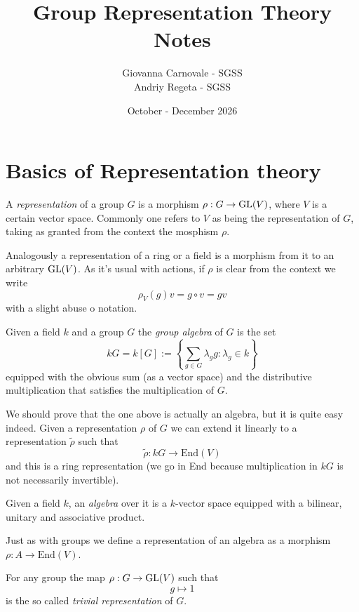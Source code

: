 \documentclass[11pt]{scrartcl}
\begin{document}
	\title{
		Group Representation Theory Notes
		 }
	\subtitle{
		Giovanna Carnovale - SGSS \\
		Andriy Regeta - SGSS 
	}
	\date{October - December 2026}
	
	
	\maketitle
	
	\tableofcontents
	
	\newpage
	
	\section{Basics of Representation theory}
	
	\begin{definition}
		A \textit{representation} of a group $G$ is a morphism $\rho:G\to \operatorname{GL}(V)$, where $V$ is a certain vector space. Commonly one refers to $V$ as being the representation of $G$, taking as granted from the context the mosphism $\rho$. 
	\end{definition}
	Analogously a representation of a ring or a field is a morphism from it to an arbitrary $\operatorname{GL}(V)$. As it's usual with actions, if $\rho$ is clear from the context we write
	$$\rho_V(g)v=g\circ v=gv$$
	with a slight abuse o notation.
	\begin{definition}
		Given a field $k$ and a group $G$ the \textit{group algebra} of $G$ is the set
		$$kG=k\left[G\right]:=\left\{\sum_{g\in G}\lambda_g g:\lambda_g\in k\right\}$$
		equipped with the obvious sum (as a vector space) and the distributive multiplication that satisfies the multiplication of $G$.
	\end{definition}
	We should prove that the one above is actually an algebra, but it is quite easy indeed. Given a representation $\rho$ of $G$ we can extend it linearly to a representation $\tilde{\rho}$ such that
	$$\tilde{\rho}:kG \to \text{End}(V)$$
	and this is a ring representation (we go in End because multiplication in $kG$ is not necessarily invertible).
	\begin{definition}[Algebra]
		Given a field $k$, an \textit{algebra} over it is a $k$-vector space equipped with a bilinear, unitary and associative product.
	\end{definition}
	Just as with groups we define a representation of an algebra as a morphism $\rho:A \to \text{End}(V)$.
	\begin{example}
		For any group the map
		$\rho:G\to \operatorname{GL}(V)$
		such that
		$$g\mapsto 1$$
		is the so called \textit{trivial representation} of $G$.
	\end{example}
\end{document}
